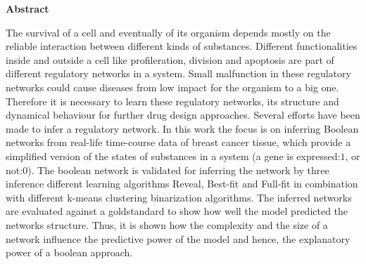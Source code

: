 \thispagestyle{empty}


\vspace*{1cm}

\begin{center}
\textbf{Abstract}
\end{center}
The survival of a cell and eventually of its organism depends mostly on  the reliable interaction between different kinds of substances. Different functionalities inside and outside a cell like profileration, division and apoptosis are part of different regulatory networks in a system. Small malfunction in these regulatory networks could cause diseases from low impact for the organism to a big one. Therefore it is necessary to learn these regulatory networks, its structure and dynamical behaviour for further drug design approaches. Several efforts have been made to infer a regulatory network.%
In this work the focus is on inferring Boolean networks from real-life time-course data of breast cancer tissue, which provide a simplified version of the states of substances in a system (a gene is expressed:$1$, or not:$0$). The boolean network is validated for inferring the network by three inference different learning algorithms Reveal, Best-fit and Full-fit in combination with different k-means clustering binarization algorithms. The inferred networks are evaluated against a goldstandard to show how well the model predicted the networks structure. Thus, it is shown how the complexity and the size of a network influence the predictive power of the model and hence, the explanatory power of a boolean approach.

\vspace*{1cm}

\noindent 

